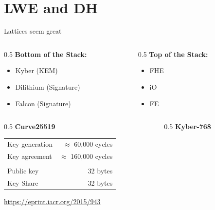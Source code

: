 \documentclass[xcolor=table,10pt,aspectratio=169]{beamer}
\begin{document}
\section{LWE and DH}
\label{sec:orgd53f0d3}
\begin{frame}[label={sec:orgf68d090}]{Lattices seem great}
\begin{columns}[t]
\begin{column}{0.5\columnwidth}
\textbf{Bottom of the Stack:}

\begin{itemize}
\item Kyber (KEM)
\item Dilithium (Signature)
\item Falcon (Signature)
\end{itemize}
\end{column}
\begin{column}{0.5\columnwidth}
\textbf{Top of the Stack:}

\begin{itemize}
\item FHE \cite{PhD:Gentry09,ITCS:BraGenVai12,JC:CGGI20,C:GenSahWat13}
\item iO \cite{FOCS:GGHRSW13,EC:BDGM20}
\item FE \cite{EC:SahWat05,TCC:BonSahWat11}
\end{itemize}

\medskip
\end{column}
\end{columns}
\begin{columns}[t]
\begin{column}{0.5\columnwidth}
\textbf{Curve25519}

\begin{center}
\begin{tabular}{lr}
\toprule
Key generation & \(\approx\) 60,000 cycles\\
Key agreement & \(\approx\) 160,000 cycles\\
 & \\
Public key & 32 bytes\\
Key Share & 32 bytes\\
\bottomrule
\end{tabular}

\end{center}

\tiny \url{https://eprint.iacr.org/2015/943}
\end{column}
\begin{column}{0.5\columnwidth}
\textbf{Kyber-768}


\end{column}
\end{columns}
\end{frame}
\end{document}
